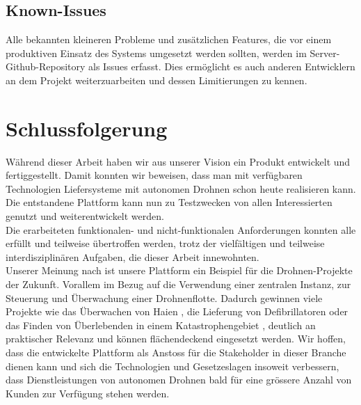 \subsection{Known-Issues}

Alle bekannten kleineren Probleme und zusätzlichen Features, die vor einem produktiven Einsatz des Systems umgesetzt werden sollten, werden im Server-Github-Repository als Issues erfasst. Dies ermöglicht es auch anderen Entwicklern an dem Projekt weiterzuarbeiten und dessen Limitierungen zu kennen.


\section{Schlussfolgerung}

Während dieser Arbeit haben wir aus unserer Vision ein Produkt entwickelt und fertiggestellt. Damit konnten wir beweisen, dass man mit verfügbaren Technologien Liefersysteme mit autonomen Drohnen schon heute realisieren kann. Die entstandene Plattform kann nun zu Testzwecken von allen Interessierten genutzt und weiterentwickelt werden.\\

Die erarbeiteten funktionalen- und nicht-funktionalen Anforderungen konnten alle erfüllt und teilweise übertroffen werden, trotz der vielfältigen und teilweise interdisziplinären Aufgaben, die dieser Arbeit innewohnten. \\

Unserer Meinung nach ist unsere Plattform ein Beispiel für die Drohnen-Projekte der Zukunft. Vorallem im Bezug auf die Verwendung einer zentralen Instanz, zur Steuerung und Überwachung einer Drohnenflotte. Dadurch gewinnen viele Projekte wie das Überwachen von Haien \cite{shark}, die Lieferung von Defibrillatoren \cite{defibrillator-drone} oder das Finden von Überlebenden in einem Katastrophengebiet \cite{catastrophic-drone}, deutlich an praktischer Relevanz und können flächendeckend eingesetzt werden. Wir hoffen, dass die entwickelte Plattform als Anstoss für die Stakeholder in dieser Branche dienen kann und sich die Technologien und Gesetzeslagen insoweit verbessern, dass Dienstleistungen von autonomen Drohnen bald für eine grössere Anzahl von Kunden zur Verfügung stehen werden.





